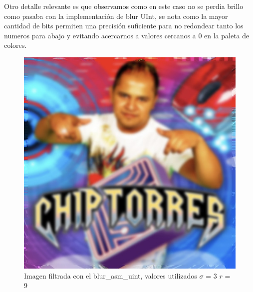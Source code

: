 Otro detalle relevante es que observamos como en este caso no se perdia brillo como pasaba con la implementación de blur UInt, se nota como la mayor cantidad de bits permiten una precisión suficiente para no redondear tanto los numeros para abajo y evitando acercarnos a valores cercanos a 0 en la paleta de colores.

\begin{figure}[H]
\centering
    \includegraphics[scale=0.5]{imgs/chip_hd_uint.jpg}
  \caption{\footnotesize{Imagen filtrada con el blur\_asm\_uint, valores utilizados $\sigma$ = 3 $r$ = 9}}
  \label{fig:tiempo1}
\end{figure}
